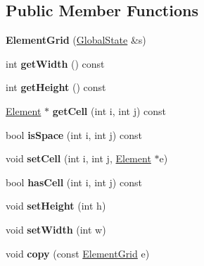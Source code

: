 \subsection*{Public Member Functions}
\begin{DoxyCompactItemize}
\item 
\mbox{\label{classstate_1_1_element_grid_a56dd28b11c12dcf5493fe263d6e00c93}} 
{\bfseries Element\+Grid} (\hyperlink{classstate_1_1_global_state}{Global\+State} \&s)
\item 
\mbox{\label{classstate_1_1_element_grid_a223578d89ab0e706156e4a9ebd18192e}} 
int {\bfseries get\+Width} () const
\item 
\mbox{\label{classstate_1_1_element_grid_a4eb505218a65d86686bbf75be79e5730}} 
int {\bfseries get\+Height} () const
\item 
\mbox{\label{classstate_1_1_element_grid_aea2a3f241f4852a8bef43a191b870bd2}} 
\hyperlink{classstate_1_1_element}{Element} $\ast$ {\bfseries get\+Cell} (int i, int j) const
\item 
\mbox{\label{classstate_1_1_element_grid_a276cbb60a6ebf0529520252bb62c35e6}} 
bool {\bfseries is\+Space} (int i, int j) const
\item 
\mbox{\label{classstate_1_1_element_grid_a60ed64fe49212644f7fb44f3aca40977}} 
void {\bfseries set\+Cell} (int i, int j, \hyperlink{classstate_1_1_element}{Element} $\ast$e)
\item 
\mbox{\label{classstate_1_1_element_grid_a6c4fa8ef09a0b186ed0427bcaa9da694}} 
bool {\bfseries has\+Cell} (int i, int j) const
\item 
\mbox{\label{classstate_1_1_element_grid_abd07f1879721724da8fb65f6100c27b7}} 
void {\bfseries set\+Height} (int h)
\item 
\mbox{\label{classstate_1_1_element_grid_a215baba29f16559346bd2562585f97c2}} 
void {\bfseries set\+Width} (int w)
\item 
\mbox{\label{classstate_1_1_element_grid_ab0bfc961842b2096404f2a12db81bb50}} 
void {\bfseries copy} (const \hyperlink{classstate_1_1_element_grid}{Element\+Grid} e)
\end{DoxyCompactItemize}
